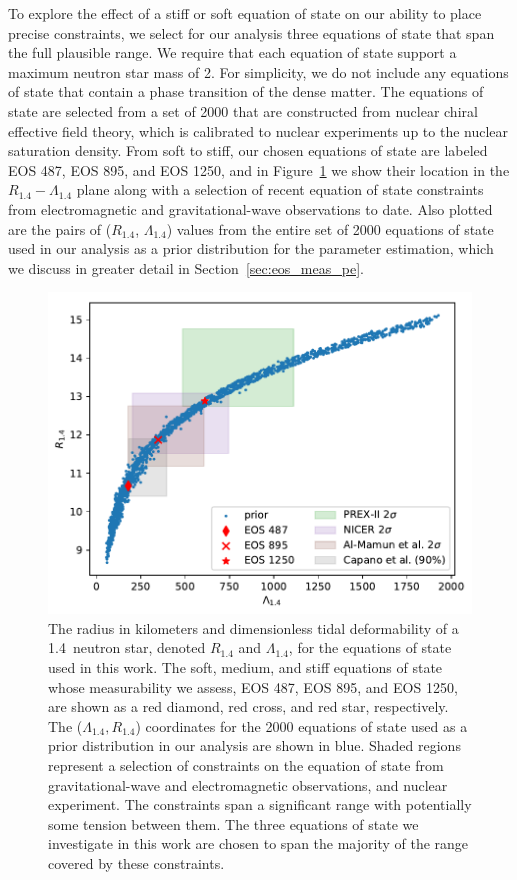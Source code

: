 To explore the effect of a stiff or soft equation of state on our ability to place precise constraints, we select for our analysis three equations of state that span the full plausible range. We require that each equation of state support a maximum neutron star mass of 2\msun. For simplicity, we do not include any equations of state that contain a phase transition of the dense matter. The equations of state are selected from a set of 2000 that are constructed from nuclear chiral effective field theory, which is calibrated to nuclear experiments up to the nuclear saturation density. From soft to stiff, our chosen equations of state are labeled EOS 487, EOS 895, and EOS 1250, and in Figure~\ref{fig:eos_with_constraints} we show their location in the $R_{1.4}-\Lambda_{1.4}$ plane along with a selection of recent equation of state constraints from electromagnetic and gravitational-wave observations to date. Also plotted are the pairs of ($R_{1.4}$, $\Lambda_{1.4}$) values from the entire set of 2000 equations of state used in our analysis as a prior distribution for the parameter estimation, which we discuss in greater detail in Section~\ref{sec:eos_meas_pe}.

\begin{figure}[ht]
\includegraphics[width=\textwidth]{Figures/eos-meas/nsat_radius_vs_lambda.pdf}
\caption{
The radius in kilometers and dimensionless tidal deformability of a 1.4\msun\ neutron star, denoted $R_{1.4}$ and $\Lambda_{1.4}$, for the equations of state used in this work. The soft, medium, and stiff equations of state whose measurability we assess, EOS 487, EOS 895, and EOS 1250, are shown as a red diamond, red cross, and red star, respectively. The ($\Lambda_{1.4}, R_{1.4}$) coordinates for the 2000 equations of state used as a prior distribution in our analysis are shown in blue. Shaded regions represent a selection of constraints on the equation of state from gravitational-wave and electromagnetic observations, and nuclear experiment. The constraints span a significant range with potentially some tension between them. The three equations of state we investigate in this work are chosen to span the majority of the range covered by these constraints.
}
\label{fig:eos_with_constraints}
\end{figure}

